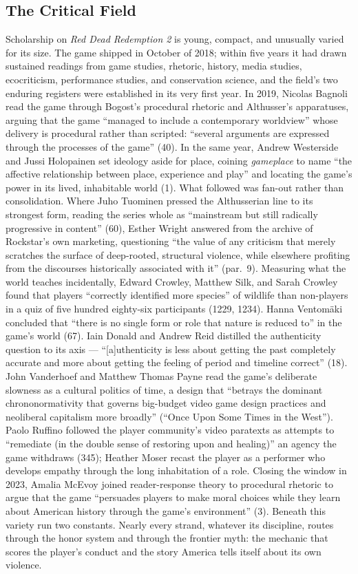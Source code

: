 \documentclass{article}
\begin{document}
\subsection*{The Critical Field}

Scholarship on \textit{Red Dead Redemption 2} is young, compact, and unusually varied for its size. The game shipped in October of 2018; within five years it had drawn sustained readings from game studies, rhetoric, history, media studies, ecocriticism, performance studies, and conservation science, and the field's two enduring registers were established in its very first year. In 2019, Nicolas Bagnoli read the game through Bogost's procedural rhetoric and Althusser's apparatuses, arguing that the game ``managed to include a contemporary worldview'' whose delivery is procedural rather than scripted: ``several arguments are expressed through the processes of the game'' (40).
In the same year, Andrew Westerside and Jussi Holopainen set ideology aside for place, coining \textit{gameplace} to name ``the affective relationship between place, experience and play'' and locating the game's power in its lived, inhabitable world (1).
What followed was fan-out rather than consolidation. Where Juho Tuominen pressed the Althusserian line to its strongest form, reading the series whole as ``mainstream but still radically progressive in content'' (60), Esther Wright answered from the archive of Rockstar's own marketing, questioning ``the value of any criticism that merely scratches the surface of deep-rooted, structural violence, while elsewhere profiting from the discourses historically associated with it'' (par.\ 9).
Measuring what the world teaches incidentally, Edward Crowley, Matthew Silk, and Sarah Crowley found that players ``correctly identified more species'' of wildlife than non-players in a quiz of five hundred eighty-six participants (1229, 1234). Hanna Ventomäki concluded that ``there is no single form or role that nature is reduced to'' in the game's world (67). Iain Donald and Andrew Reid distilled the authenticity question to its axis --- ``[a]uthenticity is less about getting the past completely accurate and more about getting the feeling of period and timeline correct'' (18).
John Vanderhoef and Matthew Thomas Payne read the game's deliberate slowness as a cultural politics of time, a design that ``betrays the dominant chrononormativity that governs big-budget video game design practices and neoliberal capitalism more broadly'' (``Once Upon Some Times in the West''). Paolo Ruffino followed the player community's video paratexts as attempts to ``remediate (in the double sense of restoring upon and healing)'' an agency the game withdraws (345); Heather Moser recast the player as a performer who develops empathy through the long inhabitation of a role. Closing the window in 2023, Amalia McEvoy joined reader-response theory to procedural rhetoric to argue that the game ``persuades players to make moral choices while they learn about American history through the game's environment'' (3).
Beneath this variety run two constants. Nearly every strand, whatever its discipline, routes through the honor system and through the frontier myth: the mechanic that scores the player's conduct and the story America tells itself about its own violence.
\end{document}
